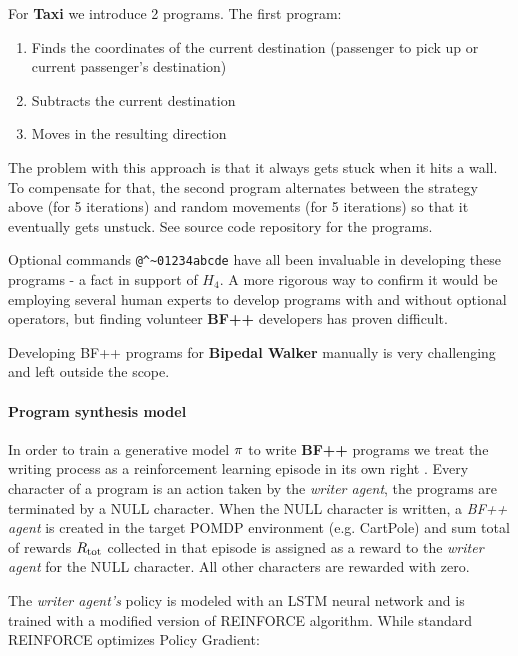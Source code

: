 For \textbf{Taxi} we introduce 2 programs.
The first program:
\begin{enumerate}
    \item Finds the coordinates of the current destination (passenger to pick up or current passenger's destination)
    \item Subtracts the current destination 
    \item Moves in the resulting direction
\end{enumerate}

The problem with this approach is that it always gets stuck when it hits a wall.
To compensate for that, the second program alternates between the strategy above (for 5 iterations) and random movements (for 5 iterations) so that it eventually gets unstuck. See source code repository for the programs.

Optional commands \verb|@^~01234abcde| have all been invaluable in developing these programs - a fact in support of $H_4$.
A more rigorous way to confirm it would be employing several human experts to develop programs with and without optional operators, but finding volunteer \textbf{BF++} developers has proven difficult. 

Developing BF++ programs for \textbf{Bipedal Walker} manually is very challenging and left outside the scope.

\paragraph{Program synthesis model}

In order to train a generative model $\pi$ to write \textbf{BF++} programs we treat the writing process as a reinforcement learning episode in its own right \cite{abolafiaNeuralProgramSynthesis2018} .
Every character of a program is an action taken by the \emph{writer agent}, the programs are terminated by a NULL character.
When the NULL character is written, a \emph{BF++ agent} is created in the target POMDP environment (e.g. CartPole) and sum total of rewards $R_\text{tot}$ collected in that episode is assigned as a reward to the \emph{writer agent} for the NULL character.
All other characters are rewarded with zero.

The \emph{writer agent's} policy is modeled with an LSTM \cite{hochreiterLongShorttermMemory1997} neural network and is trained with a modified version of REINFORCE \cite{williamsSimpleStatisticalGradientfollowing1992}algorithm.
While standard REINFORCE optimizes Policy Gradient:

